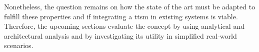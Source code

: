 Nonetheless, the question remains on how the state of the art must be adapted to fulfill these properties and if integrating a \gls{ttsm} in existing systems is viable. Therefore, the upcoming sections evaluate the concept by using analytical and architectural analysis and by investigating its utility in simplified real-world scenarios.




